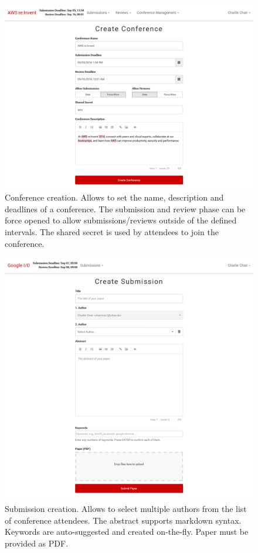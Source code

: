 \documentclass[nochapterpage,nopartpage,noheadingspace,numbersubsubsec,bigchapter,colorback,accentcolor=tud9c,10pt]{tudreport}
\begin{document}
        \begin{figure}[!ht]
            \centering
            \includegraphics[width=\textwidth]{img/ui-conference-create}
            \caption{Conference creation. Allows to set the name, description and deadlines of a conference. The submission and review phase can be force opened to allow submissions/reviews outside of the defined intervals. The shared secret is used by attendees to join the conference.}
            \label{fig:appendix:screenshots:ui-conference-create}
        \end{figure}

        \begin{figure}[!ht]
            \centering
            \includegraphics[width=\textwidth]{img/ui-submission-create}
            \caption{Submission creation. Allows to select multiple authors from the list of conference attendees. The abstract supports markdown syntax. Keywords are auto-suggested and created on-the-fly. Paper must be provided as PDF.}
            \label{fig:appendix:screenshots:ui-submission-create}
        \end{figure}
\end{document}
